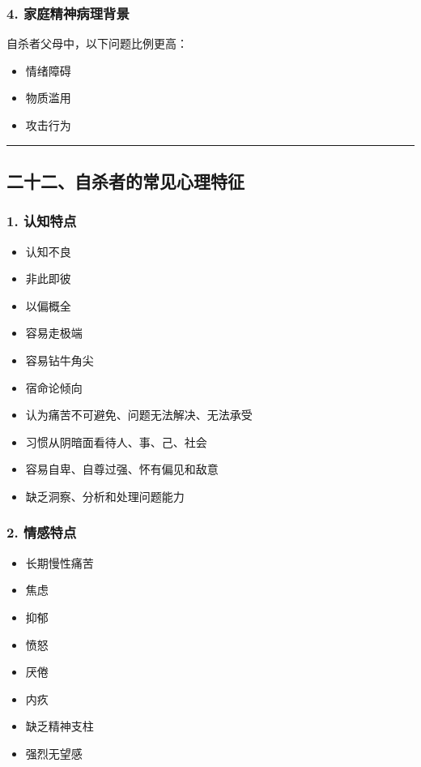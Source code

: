 \documentclass[
  chinese,
  9pt,
  a4paper,
]{ctexart}
\providecommand{\tightlist}{%
  \setlength{\itemsep}{0pt}\setlength{\parskip}{0pt}}
\begin{document}
\subsubsection{4.
家庭精神病理背景}\label{ux5bb6ux5eadux7cbeux795eux75c5ux7406ux80ccux666f}

自杀者父母中，以下问题比例更高：

\begin{itemize}
\tightlist
\item
  情绪障碍
\item
  物质滥用
\item
  攻击行为
\end{itemize}

\begin{center}\rule{0.5\linewidth}{0.5pt}\end{center}

\subsection{二十二、自杀者的常见心理特征}\label{ux4e8cux5341ux4e8cux81eaux6740ux8005ux7684ux5e38ux89c1ux5fc3ux7406ux7279ux5f81}

\subsubsection{1. 认知特点}\label{ux8ba4ux77e5ux7279ux70b9}

\begin{itemize}
\tightlist
\item
  认知不良
\item
  非此即彼
\item
  以偏概全
\item
  容易走极端
\item
  容易钻牛角尖
\item
  宿命论倾向
\item
  认为痛苦不可避免、问题无法解决、无法承受
\item
  习惯从阴暗面看待人、事、己、社会
\item
  容易自卑、自尊过强、怀有偏见和敌意
\item
  缺乏洞察、分析和处理问题能力
\end{itemize}

\subsubsection{2. 情感特点}\label{ux60c5ux611fux7279ux70b9}

\begin{itemize}
\tightlist
\item
  长期慢性痛苦
\item
  焦虑
\item
  抑郁
\item
  愤怒
\item
  厌倦
\item
  内疚
\item
  缺乏精神支柱
\item
  强烈无望感
\end{itemize}
\end{document}
